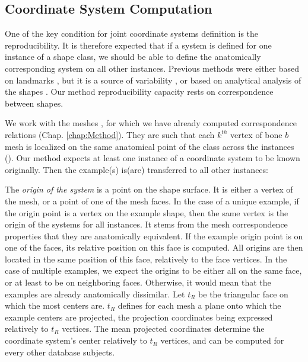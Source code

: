 
\subsection{Coordinate System Computation}

One of the key condition for joint coordinate systems definition is the reproducibility. It is therefore expected that if a system is defined for one instance of a shape class, we should be able to define the anatomically corresponding system on all other instances. Previous methods were either based on landmarks \cite{cooney_1981_kinesiology, wu_2005_isb}, but it is a source of variability \cite{della_2005_human}, or based on analytical analysis of the shapes \cite{halilaj_2013_thumb}. Our method reproducibility capacity rests on correspondence between shapes. 

We work with the meshes \mw*, for which we have already computed correspondence relations (Chap. \ref{chap:Method}). They are such that each $k^{th}$ vertex of bone $b$ mesh is localized on the same anatomical point of the class across the instances (). Our method expects at least one instance of a coordinate system to be known originally. Then the example(s) is(are) transferred to all other instances:  

The \textit{origin of the system} is a point on the shape surface. It is either a vertex of the mesh, or a point of one of the mesh faces. In the case of a unique example, if the origin point is a vertex on the example shape, then the same vertex is the origin of the systems for all instances. It stems from the mesh correspondence properties that they are anatomically equivalent. If the example origin point is on one of the faces, its relative position on this face is computed. All origins are then located in the same position of this face, relatively to the face vertices. In the case of multiple examples, we expect the origins to be either all on the same face, or at least to be on neighboring faces. Otherwise, it would mean that the examples are already anatomically dissimilar. Let $t_R$ be the triangular face on which the most centers are. $t_R$ defines for each mesh a plane onto which the example centers are projected, the projection coordinates being expressed relatively to $t_R$ vertices.
The mean projected coordinates determine the coordinate system's center relatively to $t_R$ vertices, and can be computed for every other database subjects. 

